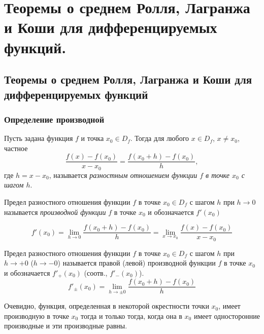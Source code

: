 \chapter{Теоремы о среднем Ролля, Лагранжа и Коши для дифференцируемых функций.}


\section{Теоремы о среднем Ролля, Лагранжа и Коши для дифференцируемых функций}

\subsection{Определение производной}

Пусть задана функция $f$ и точка $x_0\in D_f$. Тогда для любого $x \in D_f$, $x\ne x_0$, частное
\begin{equation}\label{ya3e1}
\frac{f(x)-f(x_0)}{x-x_0}=\frac{f(x_0+h)-f(x_0)}{h}, 
\end{equation}
где $h=x-x_0$, называется \textit{разностным отношением функции $f$ в точке $x_0$ с шагом $h$}.

\begin{defn}
\label{ya3d1}
Предел разностного отношения функции $f$ в точке $x_0 \in D_f$ с шагом $h$ при $h \to 0$ называется \textit{производной функции} $f$ в точке $x_0$ и обозначается $f'(x_0)$

\begin{equation}\label{ya3e2}
f'(x_0)=\lim_{h\to 0}\limits\frac{f(x_0+h)-f(x_0)}{h}=\lim_{x\to x_0}\limits \frac{f(x)-f(x_0)}{x-x_0}
\end{equation}

\end{defn}
\begin{defn} Предел разностного отношения функции $f$ в точке $x_0 \in D_f$ с шагом $h$ при $h \to +0 $ ($h \to -0$) называется правой (левой) производной функции $f$ в точке $x_0$ и обозначается $f'_+(x_0)$ (соотв., $f'_-(x_0)$).
\begin{equation}\label{ya3e3}
f'_\pm(x_0)=\lim_{h\to \pm0}\limits\frac{f(x_0+h)-f(x_0)}{h}
\end{equation}
\end{defn}

Очевидно, функция, определенная в некоторой окрестности точки $x_0$, имеет производную в точке $x_0$ тогда и только тогда, когда она в $x_0$ имеет односторонние производные и эти производные равны.



